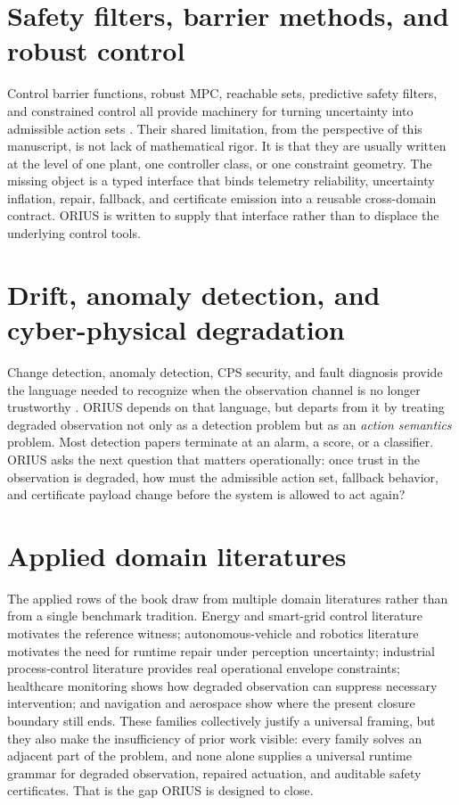 \section{{Safety filters, barrier methods, and robust control}}
Control barrier functions, robust MPC, reachable sets, predictive safety filters, and
constrained control all provide machinery for turning uncertainty into admissible action
sets \cite{ames2019control,ames2014cbf,wabersich2021predictive,nguyen2016exponential,wang2017safety,fisac2019general,mayne2005robust,langson2004tubes,rawlings2017mpc,ben2009robust,camacho2013model}.  Their shared limitation, from the perspective of this manuscript, is
not lack of mathematical rigor.  It is that they are usually written at the level of one
plant, one controller class, or one constraint geometry.  The missing object is a typed
interface that binds telemetry reliability, uncertainty inflation, repair, fallback, and
certificate emission into a reusable cross-domain contract.  ORIUS is written to supply
that interface rather than to displace the underlying control tools.

\section{{Drift, anomaly detection, and cyber-physical degradation}}
Change detection, anomaly detection, CPS security, and fault diagnosis provide the
language needed to recognize when the observation channel is no longer trustworthy
\cite{rajkumar2010cps,derler2012modeling,baheti2011cyberphysical,pasqualetti2013attack,teixeira2015secure,basseville1993detection,page1954continuous,page1955test,hinkley1971inference,liu2008isolation,breunig2000lof}.  ORIUS depends on that language, but departs from it by treating degraded
observation not only as a detection problem but as an \emph{action semantics} problem.
Most detection papers terminate at an alarm, a score, or a classifier.  ORIUS asks the
next question that matters operationally: once trust in the observation is degraded, how
must the admissible action set, fallback behavior, and certificate payload change before
the system is allowed to act again?

\section{{Applied domain literatures}}
The applied rows of the book draw from multiple domain literatures rather than from a
single benchmark tradition.  Energy and smart-grid control literature motivates the
reference witness; autonomous-vehicle and robotics literature motivates the need for
runtime repair under perception uncertainty; industrial process-control literature
provides real operational envelope constraints; healthcare monitoring shows how degraded
observation can suppress necessary intervention; and navigation and aerospace show where
the present closure boundary still ends.  These families collectively justify a universal
framing, but they also make the insufficiency of prior work visible: every family solves
an adjacent part of the problem, and none alone supplies a universal runtime grammar for
degraded observation, repaired actuation, and auditable safety certificates.  That is the
gap ORIUS is designed to close.
